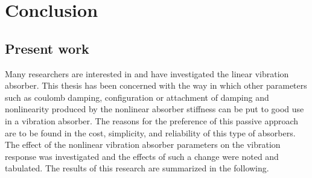 %
\chapter{Conclusion}
\section{Present work}
Many researchers are interested in and have investigated the linear vibration absorber. This thesis has been concerned with the way in which other parameters such as coulomb damping, configuration or attachment of damping and nonlinearity produced by the nonlinear absorber stiffness can be put to good use in a vibration absorber. The reasons for the preference of this passive approach are to be found in the cost, simplicity, and reliability of this type of absorbers. The effect of the nonlinear vibration absorber parameters on the vibration response was investigated and the effects of such a change were noted and tabulated. The results of this research are summarized in the following. 
